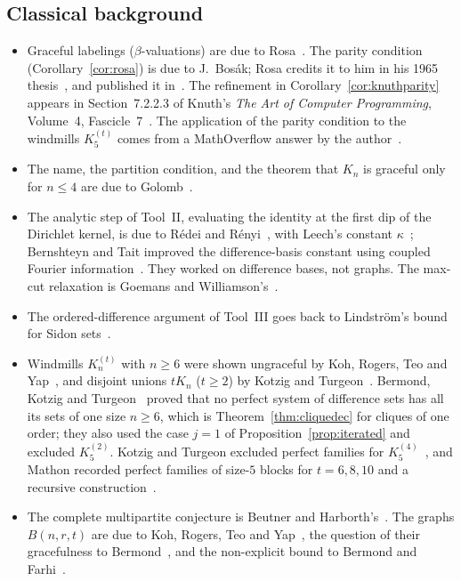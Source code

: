 \documentclass[11pt]{amsart}
\theoremstyle{tplain}
\theoremstyle{tdefinition}
\theoremstyle{tremark}
\begin{document}
\subsection*{Classical background}
\begin{itemize}
\item Graceful labelings ($\beta$-valuations) are due to Rosa~\cite{rosa65,rosa}.
  The parity condition (Corollary~\ref{cor:rosa}) is due to J.~Bos\'ak; Rosa
  credits it to him in his 1965 thesis~\cite[p.~17]{rosa65}, and published it
  in~\cite{rosa}. The refinement in Corollary~\ref{cor:knuthparity} appears in
  Section~7.2.2.3 of Knuth's \emph{The Art of Computer Programming},
  Volume~4, Fascicle~7~\cite{knuth-pre}. The application of the parity condition to the
  windmills $K_5^{(t)}$ comes from a MathOverflow answer by the
  author~\cite{mo}.
\item The name, the partition condition, and the theorem that $K_n$ is
  graceful only for $n\le4$ are due to Golomb~\cite{golomb}.
\item The analytic step of Tool~II, evaluating the identity at the first dip
  of the Dirichlet kernel, is due to R\'edei and R\'enyi~\cite{rr}, with
  Leech's constant $\kappa$~\cite{leech}; Bernshteyn and Tait improved the
  difference-basis constant using coupled Fourier information~\cite{bt}. They
  worked on difference bases, not graphs. The max-cut relaxation is Goemans and
  Williamson's~\cite{gw}.
\item The ordered-difference argument of Tool~III goes back to
  Lindstr\"om's bound for Sidon sets~\cite{lindstrom}.
\item Windmills $K_n^{(t)}$ with $n\ge6$ were shown ungraceful by Koh,
  Rogers, Teo and Yap~\cite{koh}, and disjoint unions $tK_n$ ($t\ge2$) by
  Kotzig and Turgeon~\cite{kotzig}. Bermond, Kotzig and Turgeon~\cite{bkt}
  proved that no perfect system of difference sets has all its sets of one
  size $n\ge6$, which is Theorem~\ref{thm:cliquedec} for cliques of one
  order; they also used the case $j=1$ of Proposition~\ref{prop:iterated} and
  excluded $K_5^{(2)}$. Kotzig and Turgeon excluded perfect families for
  $K_5^{(4)}$~\cite{kt77}, and Mathon recorded perfect families of size-$5$ blocks for $t=6,8,10$ and
a recursive construction~\cite{mathon}.
\item The complete multipartite conjecture is Beutner and Harborth's~\cite{beutner}.
  The graphs $B(n,r,t)$ are due to Koh, Rogers, Teo and Yap~\cite{koh}, the
  question of their gracefulness to Bermond~\cite{bermond}, and the
  non-explicit bound to Bermond and Farhi~\cite{bf}.
\end{itemize}
\end{document}
